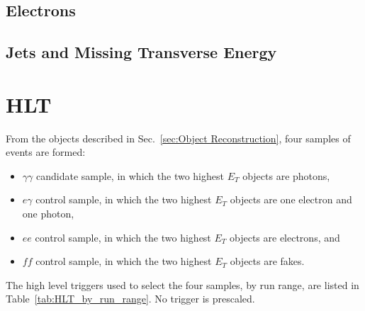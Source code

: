 \documentclass[dissertation.tex]{subfiles}
\begin{document}








\subsection{Electrons}
\subsection{Jets and Missing Transverse Energy}
\label{sec:Jets and Missing Transverse Energy}

\section{HLT}
\label{sec:HLT}

From the objects described in Sec.~\ref{sec:Object Reconstruction}, four samples of events are formed:

\begin{itemize}
\item $\gamma\gamma$ candidate sample, in which the two highest $E_{T}$ objects are photons,
\item $e\gamma$ control sample, in which the two highest $E_{T}$ objects are one electron and one photon,
\item $ee$ control sample, in which the two highest $E_{T}$ objects are electrons, and
\item $\mathit{ff}$ control sample, in which the two highest $E_{T}$ objects are fakes.
\end{itemize}
%
The high level triggers used to select the four samples, by run range, are listed in Table~\ref{tab:HLT_by_run_range}.  No trigger is prescaled.
\end{document}
